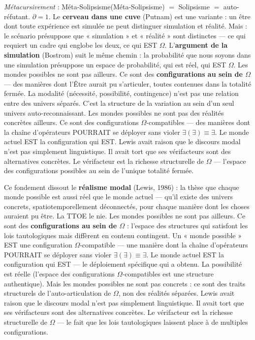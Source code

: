 \documentclass[10pt, openany, oneside]{book}
\begin{document}
\textit{Métacursivement} : Méta-Solipsisme(Méta-Solipsisme) $=$ Solipsisme $=$ auto-réfutant. $\partial = 1$. Le \textbf{cerveau dans une cuve} (Putnam) est une variante : un être dont toute expérience est simulée ne peut distinguer simulation et réalité. Mais : le scénario présuppose que « simulation » et « réalité » sont distinctes --- ce qui requiert un cadre qui englobe les deux, ce qui EST $\Omega$. L'\textbf{argument de la simulation} (Bostrom) suit le même chemin : la probabilité que nous soyons dans une simulation présuppose un espace de probabilité, qui est réel, qui EST $\Omega$. Les mondes possibles ne sont pas ailleurs. Ce sont des \textbf{configurations au sein de $\Omega$} --- des manières dont l'Être aurait pu s'articuler, toutes contenues dans la totalité fermée. La modalité (nécessité, possibilité, contingence) n'est pas une relation entre des univers séparés. C'est la structure de la variation au sein d'un seul univers auto-reconnaissant. Les mondes possibles ne sont pas des réalités concrètes ailleurs. Ce sont des configurations $\Omega$-compatibles --- des manières dont la chaîne d'opérateurs POURRAIT se déployer sans violer $\exists(\exists) \equiv \exists$. Le monde actuel EST la configuration qui EST. Lewis avait raison que le discours modal n'est pas simplement linguistique. Il avait tort que ses vérifacteurs sont des alternatives concrètes. Le vérifacteur est la richesse structurelle de $\Omega$ --- l'espace des configurations possibles au sein de l'unique totalité fermée.

Ce fondement dissout le \textbf{réalisme modal} (Lewis, 1986) : la thèse que chaque monde possible est aussi réel que le monde actuel --- qu'il existe des univers concrets, spatiotemporellement déconnectés, pour chaque manière dont les choses auraient pu être. La TTOE le nie. Les mondes possibles ne sont pas ailleurs. Ce sont des \textbf{configurations au sein de $\Omega$} : l'espace des structures qui satisfont les lois tautologiques mais diffèrent en contenu contingent. Un « monde possible » EST une configuration $\Omega$-compatible --- une manière dont la chaîne d'opérateurs POURRAIT se déployer sans violer $\exists(\exists) \equiv \exists$. Le monde actuel EST la configuration qui EST --- le déploiement spécifique qui a obtenu. La possibilité est réelle (l'espace des configurations $\Omega$-compatibles est une structure authentique). Mais les mondes possibles ne sont pas concrets : ce sont des traits structurels de l'auto-articulation de $\Omega$, non des réalités séparées. Lewis avait raison que le discours modal n'est pas simplement linguistique. Il avait tort que ses vérifacteurs sont des alternatives concrètes. Le vérifacteur est la richesse structurelle de $\Omega$ --- le fait que les lois tautologiques laissent place à de multiples configurations.
\end{document}
